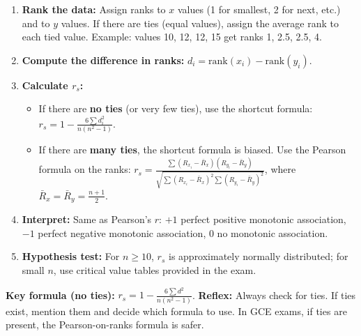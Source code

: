 \documentclass[11pt]{article}
\newcommand{\cle}[1]{{\popxbold\color{popdark}#1}}
\begin{document}
\begin{methode}
\begin{enumerate}
\item \textbf{Rank the data:} Assign ranks to $x$ values (1 for smallest, 2 for next, etc.) and to $y$ values. If there are ties (equal values), assign the \cle{average rank} to each tied value. Example: values 10, 12, 12, 15 get ranks 1, 2.5, 2.5, 4.
\item \textbf{Compute the difference in ranks:} $d_i = \text{rank}(x_i) - \text{rank}(y_i)$.
\item \textbf{Calculate $r_s$:}
\begin{itemize}
\item If there are \textbf{no ties} (or very few ties), use the shortcut formula:
$r_s = 1 - \frac{6\sum d_i^2}{n(n^2-1)}$.
\item If there are \textbf{many ties}, the shortcut formula is biased. Use the Pearson formula on the ranks:
$r_s = \frac{\sum (R_{x_i} - \bar{R}_x)(R_{y_i} - \bar{R}_y)}{\sqrt{\sum (R_{x_i} - \bar{R}_x)^2 \sum (R_{y_i} - \bar{R}_y)^2}}$,
where $\bar{R}_x = \bar{R}_y = \frac{n+1}{2}$.
\end{itemize}
\item \textbf{Interpret:} Same as Pearson's $r$: $+1$ perfect positive monotonic association, $-1$ perfect negative monotonic association, $0$ no monotonic association.
\item \textbf{Hypothesis test:} For $n \ge 10$, $r_s$ is approximately normally distributed; for small $n$, use critical value tables provided in the exam.
\end{enumerate}
\textbf{Key formula (no ties):} $r_s = 1 - \frac{6\sum d^2}{n(n^2-1)}$.
\textbf{Reflex:} Always check for ties. If ties exist, mention them and decide which formula to use. In GCE exams, if ties are present, the Pearson-on-ranks formula is safer.
\end{methode}
\end{document}
